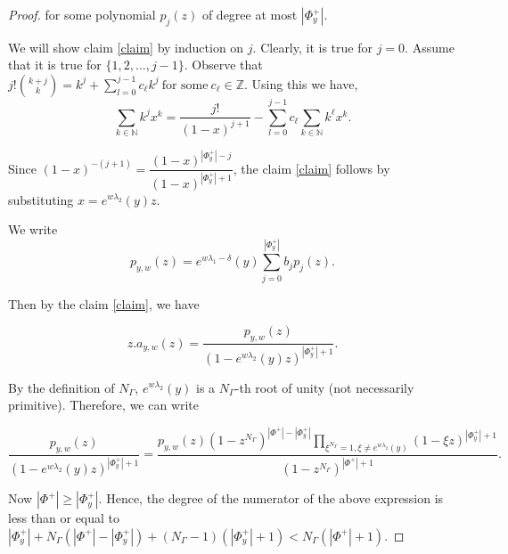 \documentclass[10pt,a4paper]{amsart}
\newcommand{\N}{{\mathbb N}}
\newcommand{\Z}{{\mathbb Z}}
\begin{document}
\begin{proof}
\noindent for some polynomial $p_j(z)$ of degree at most $|\Phi_y^+|$.

\noindent We will show claim \ref{claim} by induction on $j$. Clearly, it is true for $j=0$. Assume that it is true for $\{1,2, \dots , j-1\}$. Observe that $j ! { k+j \choose k} = k^j + \sum\limits_{l=0}^{j-1} c_{\ell} k^j\ \text{for some}\ c_{\ell} \in \Z$. Using this we have, 
$$\sum\limits_{k \in \N}k^j x^k = \dfrac{j!}{(1-x)^{j+1}} - \sum\limits_{l=0}^{j-1}c_{\ell} \sum\limits_{k \in \N} k^{\ell} x^k.$$

\noindent Since $(1-x)^{-(j+1)}=\dfrac{(1-x)^{|\Phi^+_y|-j}}{(1-x)^{|\Phi^+_y|+1}}$, the claim \ref{claim} follows by substituting $x=e^{w \lambda_2}(y) z$.

\vspace{8pt} 

\noindent We write $$p_{y,w}(z)=e^{w \lambda_1 - \delta}(y)\sum\limits_{j=0}^{|\Phi^+_y|} b_j p_j (z).$$ 

\noindent Then by the claim \ref{claim}, we have 

$$z. a_{y,w}(z)=\frac{p_{y,w}(z)}{(1 - e^{w \lambda_2}(y) z)^{|\Phi_y^+|+1}}.$$

\noindent By the definition of $N_{\Gamma}$,  $e^{w \lambda_2}(y)$ is a $N_{\Gamma}$-th root of unity (not necessarily primitive). Therefore, we can write  

$$ \frac{p_{y,w}(z)}{(1 - e^{w \lambda_2}(y) z)^{|\Phi_y^+|+1}} = \frac{p_{y,w}(z) (1-z^{N_{\Gamma}})^{|\Phi^+|-|\Phi_y^+|} \prod\limits_{\xi^{N_{\Gamma}}=1, \xi \neq e^{w \lambda_2}(y)}(1-\xi z)^{|\Phi_y^+| +1}}{(1 - z^{N_{\Gamma}})^{|\Phi^+|+1}}.$$

\noindent Now $|\Phi^+| \geq |\Phi_y^+|$. Hence, the degree of the numerator of the above expression is less than or equal to $|\Phi_y^+| + N_{\Gamma} (|\Phi^+| - |\Phi_y^+| )+ (N_{\Gamma}-1) (|\Phi_y^+| +1) < N_{\Gamma} (|\Phi^+| +1).$
\end{proof}
\end{document}
